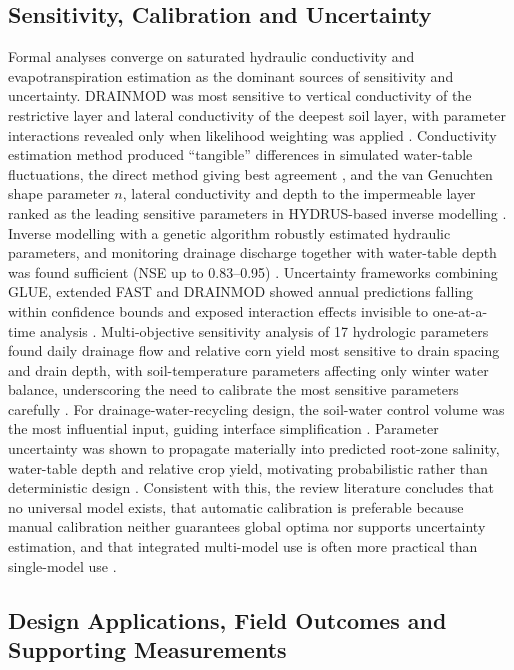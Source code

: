 \documentclass[11pt]{article}
\begin{document}
\subsection{Sensitivity, Calibration and Uncertainty}

Formal analyses converge on saturated hydraulic conductivity and evapotranspiration estimation as the dominant sources of sensitivity and uncertainty. \textsc{DRAINMOD} was most sensitive to vertical conductivity of the restrictive layer and lateral conductivity of the deepest soil layer, with parameter interactions revealed only when likelihood weighting was applied \parencite{Wang2006}. Conductivity estimation method produced ``tangible'' differences in simulated water-table fluctuations, the direct method giving best agreement \parencite{NabiSichani2012}, and the van Genuchten shape parameter $n$, lateral conductivity and depth to the impermeable layer ranked as the leading sensitive parameters in HYDRUS-based inverse modelling \parencite{Sedaghatdoost2018}. Inverse modelling with a genetic algorithm robustly estimated hydraulic parameters, and monitoring drainage discharge together with water-table depth was found sufficient (NSE up to 0.83--0.95) \parencite{Sedaghatdoost2018}. Uncertainty frameworks combining GLUE, extended FAST and \textsc{DRAINMOD} showed annual predictions falling within confidence bounds and exposed interaction effects invisible to one-at-a-time analysis \parencite{Wang2006}. Multi-objective sensitivity analysis of 17 hydrologic parameters found daily drainage flow and relative corn yield most sensitive to drain spacing and drain depth, with soil-temperature parameters affecting only winter water balance, underscoring the need to calibrate the most sensitive parameters carefully \parencite{Timalsina2023}. For drainage-water-recycling design, the soil-water control volume was the most influential input, guiding interface simplification \parencite{Reinhart2020}. Parameter uncertainty was shown to propagate materially into predicted root-zone salinity, water-table depth and relative crop yield, motivating probabilistic rather than deterministic design \parencite{Alzraiee2013,Alzraiee2013b}. Consistent with this, the review literature concludes that no universal model exists, that automatic calibration is preferable because manual calibration neither guarantees global optima nor supports uncertainty estimation, and that integrated multi-model use is often more practical than single-model use \parencite{Singh2019b}.

\subsection{Design Applications, Field Outcomes and Supporting Measurements}
\end{document}
